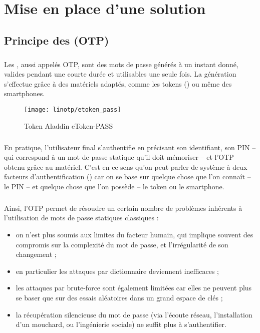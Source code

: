 \chapter{Mise en place d'une solution \alinotp{}}
\label{section:linotp}

\section{Principe des  (OTP)}

\paragraph{}
Les , aussi appelés OTP, sont des mots de passe générés à un instant donné, valides pendant une courte durée et utilisables une seule fois.
La génération s'effectue grâce à des matériels adaptés, comme les tokens () ou même des smartphones.

\begin{figure}
	\centering
	\texttt{[image: linotp/etoken\_pass]}
	\caption{Token Aladdin eToken-PASS}
	\label{figure:linotp:token}
\end{figure}

\paragraph{}
En pratique, l'utilisateur final s'authentifie en précisant son identifiant, son PIN -- qui correspond à un mot de passe statique qu'il doit mémoriser -- et l'OTP obtenu grâce au matériel.
C'est en ce sens qu'on peut parler de système à deux facteurs d'authentification () car on se base sur quelque chose que l'on connaît -- le PIN -- et quelque chose que l'on possède -- le token ou le smartphone.

\paragraph{}
Ainsi, l'OTP permet de résoudre un certain nombre de problèmes inhérents à l'utilisation de mots de passe statiques classiques :

\begin{itemize}
	\item on n'est plus soumis aux limites du facteur humain, qui implique souvent des compromis sur la complexité du mot de passe, et l'irrégularité de son changement ;
	\item en particulier les attaques par dictionnaire deviennent inefficaces ;
	\item les attaques par brute-force sont également limitées car elles ne peuvent plus se baser que sur des essais aléatoires dans un grand espace de clés ;
	\item la récupération silencieuse du mot de passe (via l'écoute réseau, l'installation d'un mouchard, ou l'ingénierie sociale) ne suffit plus à s'authentifier.
\end{itemize}


